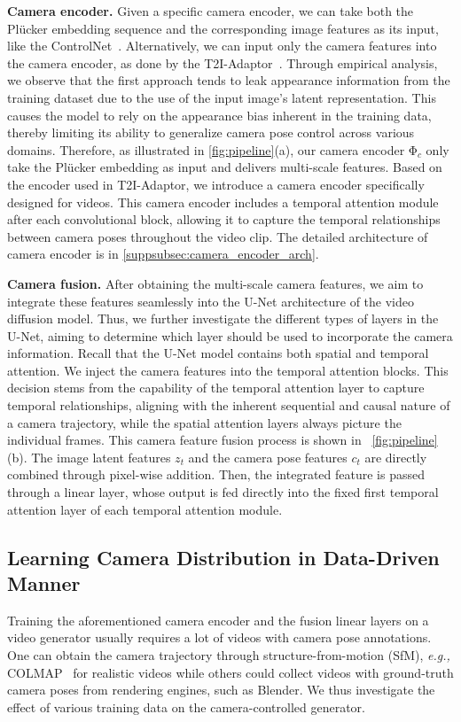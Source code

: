 \noindent \textbf{Camera encoder.}
%
Given a specific camera encoder, we can take both the Plücker embedding sequence and the corresponding image features as its input, like the ControlNet~\citep{controlnet}.
%
Alternatively, we can input only the camera features into the camera encoder, as done by the T2I-Adaptor~\citep{t2iadaptor}.
%
Through empirical analysis, we observe that the first approach tends to leak appearance information from the training dataset due to the use of the input image’s latent representation. 
%
This causes the model to rely on the appearance bias inherent in the training data, thereby limiting its ability to generalize camera pose control across various domains.
%
Therefore, as illustrated in \cref{fig:pipeline}(a), our camera encoder $\mathrm{\Phi}_c$ only take the Plücker embedding as input and delivers multi-scale features.
%
Based on the encoder used in T2I-Adaptor, we introduce a camera encoder specifically designed for videos. 
%
This camera encoder includes a temporal attention module after each convolutional block, allowing it to capture the temporal relationships between camera poses throughout the video clip. 
%
The detailed architecture of camera encoder is in \cref{suppsubsec:camera_encoder_arch}.

\noindent \textbf{Camera fusion.} 
After obtaining the multi-scale camera features, we aim to integrate these features seamlessly into the U-Net architecture of the video diffusion model.
%
Thus, we further investigate the different types of layers in the U-Net, aiming to determine which layer should be used to incorporate the camera information. 
%
Recall that the U-Net model contains both spatial and temporal attention. 
%
We inject the camera features into the temporal attention blocks.
%
This decision stems from the capability of the temporal attention layer to capture temporal relationships, aligning with the inherent sequential and causal nature of a camera trajectory, while the spatial attention layers always picture the individual frames.
% 
This camera feature fusion process is shown in ~\cref{fig:pipeline}(b).
%
The image latent features $z_t$ and the camera pose features $c_t$ are directly combined through pixel-wise addition.
%
Then, the integrated feature is passed through a linear layer, whose output is fed directly into the fixed first temporal attention layer of each temporal attention module.
\subsection{Learning Camera Distribution in Data-Driven Manner}\label{subsec:cam_data}
Training the aforementioned camera encoder and the fusion linear layers on a video generator usually requires a lot of videos with camera pose annotations. 
%
One can obtain the camera trajectory through structure-from-motion (SfM), \emph{e.g.,} COLMAP~\citep{schoenberger2016sfm} for realistic videos while others could collect videos with ground-truth camera poses from rendering engines, such as Blender. 
%
We thus investigate the effect of various training data on the camera-controlled generator.


